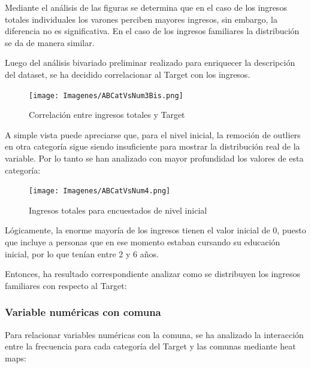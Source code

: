 \documentclass[a4paper]{article}
\begin{document}
            Mediante el análisis de las figuras se determina que en el caso de los ingresos totales individuales los varones perciben mayores ingresos, sin embargo, la diferencia no es significativa. En el caso de los ingresos familiares la distribución se da de manera similar. 
 
 \vspace{1cm}

          Luego del análisis bivariado preliminar realizado para enriquecer la descripción del dataset, se ha decidido correlacionar al Target con los ingresos.
            \begin{figure}[H]
            \centering
                \texttt{[image: Imagenes/ABCatVsNum3Bis.png]}
                \caption{Correlación entre ingresos totales y Target}
                \label{AB Target and Total Incomes}
            \end{figure}
 
            A simple vista puede apreciarse que, para el nivel inicial, la remoción de outliers en otra categoría sigue siendo insuficiente para mostrar la distribución real de la variable. Por lo tanto se han analizado con mayor profundidad los valores de esta categoría:
 
            \begin{figure}[H]
            \centering
                \texttt{[image: Imagenes/ABCatVsNum4.png]}
                \caption{Ingresos totales para encuestados de nivel inicial}
                \label{AB Total Incomes for Initial level}
            \end{figure}
 
            Lógicamente, la enorme mayoría de los ingresos tienen el valor inicial de 0, puesto que incluye a personas que en ese momento estaban cursando su educación inicial, por lo que tenían entre 2 y 6 años.

            Entonces, ha resultado correspondiente analizar como se distribuyen los ingresos familiares con respecto al Target:
 

        \newpage
 
        \subsubsection{Variable numéricas con comuna}

            Para relacionar variables numéricas con la comuna, se ha analizado la interacción entre la frecuencia para cada categoría del Target y las comunas mediante heat maps: 
 
\end{document}

